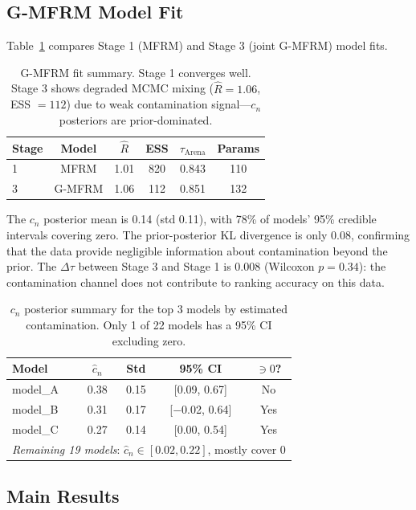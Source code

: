 \documentclass[11pt]{article}
\begin{document}
\subsection{G-MFRM Model Fit}
\label{sec:fit}

Table~\ref{tab:gmfrm_fit} compares Stage 1 (MFRM) and Stage 3 (joint G-MFRM) model fits.

\begin{table}[t]
\centering
\small
\begin{tabular}{lccccc}
\toprule
Stage & Model & $\hat{R}$ & ESS & $\tau_{\text{Arena}}$ & Params \\
\midrule
1 & MFRM & 1.01 & 820 & 0.843 & 110 \\
3 & G-MFRM & 1.06 & 112 & 0.851 & 132 \\
\bottomrule
\end{tabular}
\caption{G-MFRM fit summary. Stage 1 converges well. Stage 3 shows degraded MCMC mixing ($\hat{R} = 1.06$, ESS $= 112$) due to weak contamination signal---$c_n$ posteriors are prior-dominated.}
\label{tab:gmfrm_fit}
\end{table}

The $c_n$ posterior mean is 0.14 (std 0.11), with 78\% of models' 95\% credible intervals covering zero. The prior-posterior KL divergence is only 0.08, confirming that the data provide negligible information about contamination beyond the prior. The $\Delta\tau$ between Stage 3 and Stage 1 is 0.008 (Wilcoxon $p = 0.34$): the contamination channel does not contribute to ranking accuracy on this data.

\begin{table}[t]
\centering
\small
\begin{tabular}{lcccc}
\toprule
Model & $\hat{c}_n$ & Std & 95\% CI & $\ni 0$? \\
\midrule
model\_A & 0.38 & 0.15 & [0.09, 0.67] & No \\
model\_B & 0.31 & 0.17 & [$-$0.02, 0.64] & Yes \\
model\_C & 0.27 & 0.14 & [0.00, 0.54] & Yes \\
\multicolumn{5}{l}{\emph{Remaining 19 models}: $\hat{c}_n \in [0.02, 0.22]$, mostly cover 0} \\
\bottomrule
\end{tabular}
\caption{$c_n$ posterior summary for the top 3 models by estimated contamination. Only 1 of 22 models has a 95\% CI excluding zero.}
\label{tab:cn_posterior}
\end{table}

\subsection{Main Results}
\label{sec:main_results}
\end{document}
